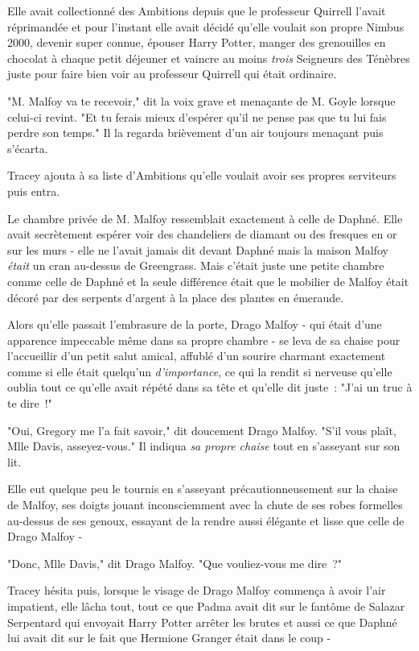 Elle avait collectionné des Ambitions depuis que le professeur Quirrell l'avait réprimandée et pour l'instant elle avait décidé qu'elle voulait son propre Nimbus 2000, devenir super connue, épouser Harry Potter, manger des grenouilles en chocolat à chaque petit déjeuner et vaincre au moins \emph{trois} Seigneurs des Ténèbres juste pour faire bien voir au professeur Quirrell qui était ordinaire.

"M. Malfoy va te recevoir," dit la voix grave et menaçante de M. Goyle lorsque celui-ci revint. "Et tu ferais mieux d'espérer qu'il ne pense pas que tu lui fais perdre son temps." Il la regarda brièvement d'un air toujours menaçant puis s'écarta.

Tracey ajouta à sa liste d'Ambitions qu'elle voulait avoir ses propres serviteurs puis entra.

Le chambre privée de M. Malfoy ressemblait exactement à celle de Daphné. Elle avait secrètement espérer voir des chandeliers de diamant ou des fresques en or sur les murs - elle ne l'avait jamais dit devant Daphné mais la maison Malfoy \emph{était} un cran au-dessus de Greengrass. Mais c'était juste une petite chambre comme celle de Daphné et la seule différence était que le mobilier de Malfoy était décoré par des serpents d'argent à la place des plantes en émeraude.

Alors qu'elle passait l'embrasure de la porte, Drago Malfoy - qui était d'une apparence impeccable même dans sa propre chambre - se leva de sa chaise pour l'accueillir d'un petit salut amical, affublé d'un sourire charmant exactement comme si elle était quelqu'un \emph{d'importance}, ce qui la rendit si nerveuse qu'elle oublia tout ce qu'elle avait répété dans sa tête et qu'elle dit juste~: "J'ai un truc à te dire~!"

"Oui, Gregory me l'a fait savoir," dit doucement Drago Malfoy. "S'il vous plaît, Mlle Davis, asseyez-vous." Il indiqua \emph{sa propre chaise} tout en s'asseyant sur son lit.

Elle eut quelque peu le tournis en s'asseyant précautionneusement sur la chaise de Malfoy, ses doigts jouant inconsciemment avec la chute de ses robes formelles au-dessus de ses genoux, essayant de la rendre aussi élégante et lisse que celle de Drago Malfoy -

"Donc, Mlle Davis," dit Drago Malfoy. "Que vouliez-vous me dire~?"

Tracey hésita puis, lorsque le visage de Drago Malfoy commença à avoir l'air impatient, elle lâcha tout, tout ce que Padma avait dit sur le fantôme de Salazar Serpentard qui envoyait Harry Potter arrêter les brutes et aussi ce que Daphné lui avait dit sur le fait que Hermione Granger était dans le coup -


